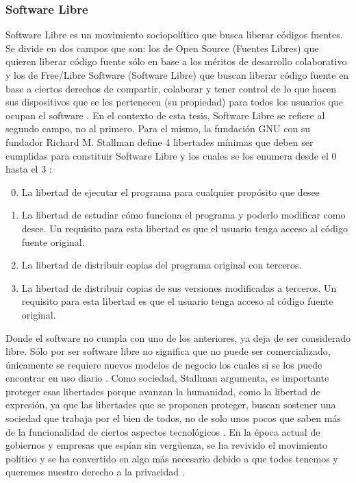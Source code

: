 \subsubsection{Software Libre}
Software Libre es un movimiento sociopolítico que busca liberar códigos fuentes. Se divide en dos campos que son: los de Open Source (Fuentes Libres) que quieren liberar código fuente sólo en base a los méritos de desarrollo colaborativo y los de Free/Libre Software (Software Libre) que buscan liberar código fuente en base a ciertos derechos de compartir, colaborar y tener control de lo que hacen sus dispositivos que se les pertenecen (su propiedad) para todos los usuarios que ocupan el software \citep{GNU-FLOSS-vs-FOSS} \citep{GNU-Open-vs-Free}. En el contexto de esta tesis, Software Libre se refiere al segundo campo, no al primero. Para el mismo, la fundación GNU con su fundador Richard M. Stallman define 4 libertades mínimas que deben ser cumplidas para constituir Software Libre y los cuales se los enumera desde el 0 hasta el 3 \citep{GNU-Freedom} \citep{GNU-Free-Software}:

\begin{enumerate}
  \setcounter{enumi}{-1}
  \item La libertad de ejecutar el programa para cualquier propósito que desee
  \item La libertad de estudiar cómo funciona el programa y poderlo modificar como desee. Un requisito para esta libertad es que el usuario tenga acceso al código fuente original.
  \item La libertad de distribuir copias del programa original con terceros.
  \item La libertad de distribuir copias de sus versiones modificadas a terceros. Un requisito para esta libertad es que el usuario tenga acceso al código fuente original.
\end{enumerate}


Donde el software no cumpla con uno de los anteriores, ya deja de ser considerado libre. Sólo por ser software libre no significa que no puede ser comercializado, únicamente se requiere nuevos modelos de negocio los cuales si se los puede encontrar en uso diario \citep{GNU-Free-Software}. Como sociedad, Stallman argumenta, es importante proteger esas libertades porque avanzan la humanidad, como la libertad de expresión, ya que las libertades que se proponen proteger, buscan sostener una sociedad que trabaja por el bien de todos, no de solo unos pocos que saben más de la funcionalidad de ciertos aspectos tecnológicos \citep{GNU-Open-vs-Free}. En la época actual de gobiernos y empresas que espían sin vergüenza, se ha revivido el movimiento político y se ha convertido en algo más necesario debido a que todos tenemos y  queremos nuestro derecho a la privacidad \citep{GNU-Freedom}.



